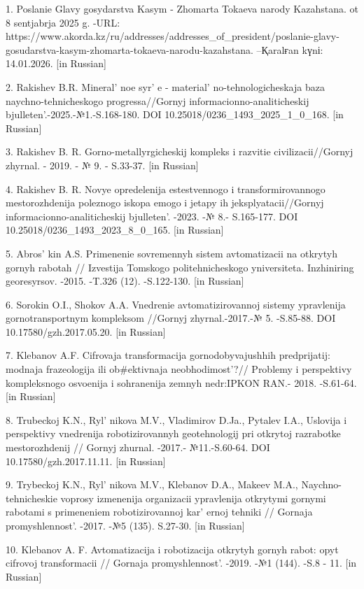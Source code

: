 \begin{refs}
1. Poslanie Glavy gosydarstva Kasym - Zhomarta Tokaeva narody
Kazahstana. ot 8 sentjabrja 2025 g. -URL:
https://www.akorda.kz/ru/addresses/addresses\_of\_president/poslanie-glavy-gosudarstva-kasym-zhomarta-tokaeva-narodu-kazahstana.
--Қaralғan kүnі: 14.01.2026. {[}in Russian{]}

2. Rakishev B.R. Mineral' noe syr' e -
material' no-tehnologicheskaja baza naychno-tehnicheskogo
progressa//Gornyj informacionno-analiticheskij
bjulleten'.-2025.-№1.-S.168-180. DOI
10.25018/0236\_1493\_2025\_1\_0\_168. {[}in Russian{]}

3. Rakishev B. R. Gorno-metallyrgicheskij kompleks i razvitie
civilizacii//Gornyj zhyrnal. - 2019. - № 9. - S.33-37. {[}in Russian{]}

4. Rakishev B. R. Novye opredelenija estestvennogo i transformirovannogo
mestorozhdenija poleznogo iskopa emogo i jetapy ih jeksplyatacii//Gornyj
informacionno-analiticheskij bjulleten'. -2023. -№ 8.-
S.165-177. DOI 10.25018/0236\_1493\_2023\_8\_0\_165. {[}in Russian{]}

5. Abros' kin A.S. Primenenie sovremennyh sistem
avtomatizacii na otkrytyh gornyh rabotah // Izvestija Tomskogo
politehnicheskogo yniversiteta. Inzhiniring georesyrsov. -2015. -T.326
(12). -S.122-130. {[}in Russian{]}

6. Sorokin O.I., Shokov A.A. Vnedrenie avtomatizirovannoj sistemy
ypravlenija gornotransportnym kompleksom //Gornyj zhyrnal.-2017.-№
5. -S.85-88. DOI 10.17580/gzh.2017.05.20. {[}in Russian{]}

7. Klebanov A.F. Cifrovaja transformacija gornodobyvajushhih
predprijatij: modnaja frazeologija ili ob\#ektivnaja
neobhodimost'?// Problemy i perspektivy kompleksnogo
osvoenija i sohranenija zemnyh nedr:IPKON RAN.- 2018. -S.61-64. {[}in
Russian{]}

8. Trubeckoj K.N., Ryl' nikova M.V., Vladimirov D.Ja.,
Pytalev I.A., Uslovija i perspektivy vnedrenija robotizirovannyh
geotehnologij pri otkrytoj razrabotke mestorozhdenij // Gornyj zhurnal.
-2017.- №11.-S.60-64. DOI 10.17580/gzh.2017.11.11. {[}in Russian{]}

9. Trybeckoj K.N., Ryl' nikova M.V., Klebanov D.A.,
Makeev M.A., Naychno-tehnicheskie voprosy izmenenija organizacii
ypravlenija otkrytymi gornymi rabotami s primeneniem robotizirovannoj
kar' ernoj tehniki // Gornaja
promyshlennost'. -2017. -№5 (135). S.27-30. {[}in
Russian{]}

10. Klebanov A. F. Avtomatizacija i robotizacija otkrytyh gornyh rabot:
opyt cifrovoj transformacii // Gornaja promyshlennost'.
-2019. -№1 (144). -S.8 - 11. {[}in Russian{]}


\end{refs}
